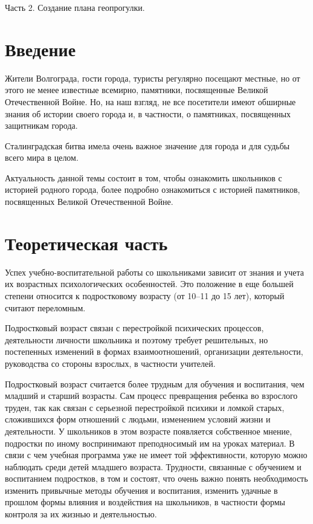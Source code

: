 \newcommand{\eX}{\stepcounter{theX}X\arabic{theX}}

\begin{center}
  \large Часть 2. Создание плана геопрогулки.
\end{center}

\section*{Введение}

Жители Волгограда, гости города, туристы регулярно посещают местные, но от этого
не менее известные всемирно, памятники, посвященные Великой Отечественной Войне.
Но, на наш взгляд, не все посетители имеют обширные знания об истории своего
города и, в частности, о памятниках, посвященных защитникам города.

Сталинградская битва имела очень важное значение для города и для судьбы всего
мира в целом.

Актуальность данной темы состоит в том, чтобы ознакомить школьников с историей
родного города, более подробно ознакомиться с историей памятников, посвященных
Великой Отечественной Войне.

\section*{Теоретическая часть}

Успех учебно-воспитательной работы со школьниками зависит от знания и учета их
возрастных психологических особенностей. Это положение в еще большей степени
относится к подростковому возрасту (от 10--11 до 15 лет), который считают
переломным.

Подростковый возраст связан с перестройкой психических процессов, деятельности
личности школьника и поэтому требует решительных, но постепенных изменений в
формах взаимоотношений, организации деятельности, руководства со стороны
взрослых, в частности учителей. 

Подростковый возраст считается более трудным для обучения и воспитания, чем
младший и старший возрасты. Сам процесс превращения ребенка во
взрослого труден, так как связан с серьезной перестройкой психики и ломкой
старых, сложившихся форм отношений с людьми, изменением условий жизни и
деятельности. У школьников в этом возрасте появляется собственное мнение,
подростки по иному воспринимают преподносимый им на уроках материал. В связи с
чем учебная программа уже не имеет той эффективности, которую можно наблюдать
среди детей младшего возраста. Трудности, связанные с обучением и воспитанием
подростков, в том и состоят, что очень важно понять необходимость изменить
привычные методы обучения и воспитания, изменить удачные в прошлом формы
влияния и воздействия на школьников, в частности формы контроля за их жизнью и
деятельностью.

